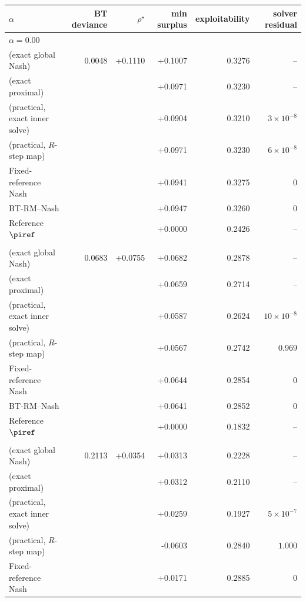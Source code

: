 \begin{tabular}{l r r r r r}
\toprule
$\alpha$ & BT deviance & $\rho^\star$ & min surplus & exploitability & solver residual \\
\midrule
\multicolumn{6}{l}{\textit{$\alpha=0.00$}} \\
\quad \NBPO{} (exact global Nash) & 0.0048 & +0.1110 & +0.1007 & 0.3276 & -- \\
\quad \NBPO{} (exact proximal) &  &  & +0.0971 & 0.3230 & -- \\
\quad \NBPO{} (practical, exact inner solve) &  &  & +0.0904 & 0.3210 & $3\!\times\!10^{-8}$ \\
\quad \NBPO{} (practical, $R$-step map) &  &  & +0.0971 & 0.3230 & $6\!\times\!10^{-8}$ \\
\quad Fixed-reference Nash &  &  & +0.0941 & 0.3275 & $0$ \\
\quad BT-RM--Nash &  &  & +0.0947 & 0.3260 & $0$ \\
\quad Reference $\piref$ &  &  & +0.0000 & 0.2426 & -- \\
\addlinespace
\multicolumn{6}{l}{\textit{$\alpha=0.25$}} \\
\quad \NBPO{} (exact global Nash) & 0.0683 & +0.0755 & +0.0682 & 0.2878 & -- \\
\quad \NBPO{} (exact proximal) &  &  & +0.0659 & 0.2714 & -- \\
\quad \NBPO{} (practical, exact inner solve) &  &  & +0.0587 & 0.2624 & $10\!\times\!10^{-8}$ \\
\quad \NBPO{} (practical, $R$-step map) &  &  & +0.0567 & 0.2742 & $0.969$ \\
\quad Fixed-reference Nash &  &  & +0.0644 & 0.2854 & $0$ \\
\quad BT-RM--Nash &  &  & +0.0641 & 0.2852 & $0$ \\
\quad Reference $\piref$ &  &  & +0.0000 & 0.1832 & -- \\
\addlinespace
\multicolumn{6}{l}{\textit{$\alpha=0.50$}} \\
\quad \NBPO{} (exact global Nash) & 0.2113 & +0.0354 & +0.0313 & 0.2228 & -- \\
\quad \NBPO{} (exact proximal) &  &  & +0.0312 & 0.2110 & -- \\
\quad \NBPO{} (practical, exact inner solve) &  &  & +0.0259 & 0.1927 & $5\!\times\!10^{-7}$ \\
\quad \NBPO{} (practical, $R$-step map) &  &  & -0.0603 & 0.2840 & $1.000$ \\
\quad Fixed-reference Nash &  &  & +0.0171 & 0.2885 & $0$ \\

\end{tabular}
